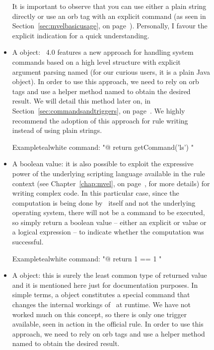\begin{description}
\begin{description}
\begin{itemize}[label={--}]
It is important to observe that you can use either a plain string directly or use an orb tag with an explicit  command (as seen in Section~\ref{sec:mvelbasicusage}, on page~\pageref{sec:mvelbasicusage}). Personally, I favour the explicit indication for a quick understanding.

\item A  object: \arara\ 4.0 features a new approach for handling system commands based on a high level structure with explicit argument parsing named  (for our curious users, it is a plain Java object). In order to use this approach, we need to rely on orb tags and use a helper method named  to obtain the desired result. We will detail this method later on, in Section~\ref{sec:commandsandtriggers}, on page~\pageref{sec:commandsandtriggers}. We highly recommend the adoption of this approach for rule writing instead of using plain strings.

\begin{codebox}{Example}{teal}{\icnote}{white}
command: "@{ return getCommand('ls') }"
\end{codebox}

\item A boolean value: it is also possible to exploit the expressive power of the underlying scripting language available in the rule context (see Chapter~\ref{chap:mvel}, on page~\pageref{chap:mvel}, for more details) for writing complex code. In this particular case, since the computation is being done by \arara\ itself and not the underlying operating system, there will not be a command to be executed, so simply return a boolean value -- either an explicit  or  value or a logical expression -- to indicate whether the computation was successful.

\begin{codebox}{Example}{teal}{\icnote}{white}
command: "@{ return 1 == 1 }"
\end{codebox}

\item A  object: this is surely the least common type of returned value and it is mentioned here just for documentation purposes. In simple terms, a  object constitutes a special command that changes the internal workings of \arara\ at runtime. We have not worked much on this concept, so there is only one trigger available, seen in action in the official  rule. In order to use this approach, we need to rely on orb tags and use a helper method named  to obtain the desired result.
\end{itemize}


\end{description}
\end{description}
